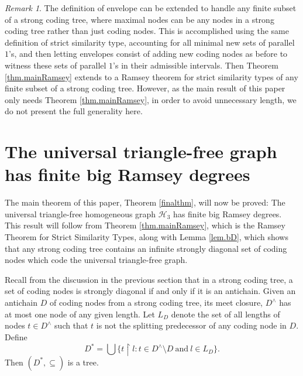 \documentclass{amsart}
\theoremstyle{remark}
\newtheorem{rem}[thm]{Remark}
\theoremstyle{definition}
\theoremstyle{remark}
\newcommand{\sse}{\subseteq}
\newcommand{\re}{\restriction}
\begin{document}
\begin{rem}
The definition of envelope can be  extended to handle  any finite subset of a strong coding tree,
where maximal nodes can be any nodes in a strong coding tree rather than just coding nodes.
This is accomplished using the same definition of strict similarity type, accounting for all minimal new sets of parallel $1$'s,
and then letting envelopes consist of adding new coding nodes as before to witness these sets of parallel $1$'s in their admissible intervals.
Then
Theorem \ref{thm.mainRamsey} extends to a
Ramsey theorem  for  strict similarity types of any finite subset of a strong coding tree.
However, as the
main result of this paper
only needs Theorem \ref{thm.mainRamsey},
in order to avoid unnecessary length, we do not present the full generality  here.
\end{rem}





\section{The  universal triangle-free graph has finite big Ramsey degrees}\label{sec.7}



The main theorem of this paper, Theorem \ref{finalthm}, will now be proved:
 The universal triangle-free homogeneous graph $\mathcal{H}_3$ has finite  big Ramsey degrees.
This result will  follow from
Theorem \ref{thm.mainRamsey}, which is
the
Ramsey Theorem for Strict Similarity Types,
  along with Lemma \ref{lem.bD},  which shows that any strong coding tree contains an infinite strongly diagonal set of coding nodes  which  code the universal triangle-free graph.


Recall from the discussion in the previous section that in a strong coding tree, a set of coding nodes is strongly diagonal if and only if it is an antichain.
Given an antichain $D$ of coding nodes from a strong coding tree,
its  meet closure,
 $D^{\wedge}$  has  at most one node of any given length.
Let $L_D$ denote the set of all
lengths of nodes $t\in D^{\wedge}$
such that
 $t$ is not the splitting predecessor of any coding node in $D$.
Define
\begin{equation}\label{eq.D^*}
D^*=\bigcup\{t  \re l:t\in D^{\wedge}\setminus D
\mathrm{\ and\ }l\in L_D\}.
\end{equation}
Then $(D^*,\sse)$ is a tree.
\end{document}
